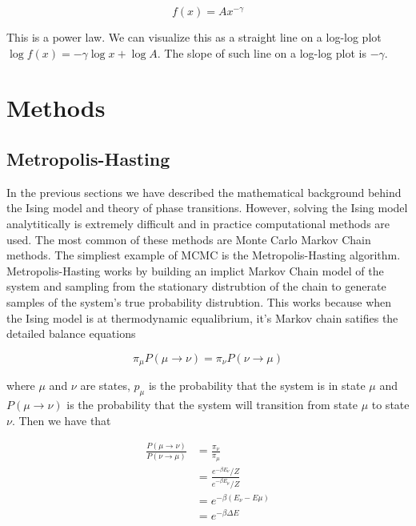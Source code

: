 \documentclass{article}
\begin{document}
\begin{equation}
    f(x) = A x^{-\gamma}
\end{equation}

This is a power law. We can visualize this as a straight line on a log-log plot $\log f(x) = -\gamma \log x + \log A$.
The slope of such line on a log-log plot is $-\gamma$.
 
\section{Methods}
\label{Methods}

\subsection{Metropolis-Hasting}
In the previous sections we have described the mathematical background behind the Ising model and theory of phase transitions.
However, solving the Ising model analytitically is extremely difficult and in practice computational methods are used. The most common of these methods 
are Monte Carlo Markov Chain methods. The simpliest example of MCMC is the Metropolis-Hasting algorithm. Metropolis-Hasting works by building 
an implict Markov Chain model of the system and sampling from the stationary distrubtion of the chain to generate samples of the system's true probability
distrubtion. This works because when the Ising model is at thermodynamic equalibrium, it's Markov chain satifies the detailed balance equations

\begin{equation}
    \pi_{\mu} P(\mu \rightarrow \nu) = \pi_{\nu} P(\nu \rightarrow \mu)
\end{equation}

where $\mu$ and $\nu$ are states, $p_{\mu}$ is the probability that the system is in state $\mu$ and $P(\mu \rightarrow \nu)$
is the probability that the system will transition from state $\mu$ to state $\nu$. Then we have that 

\begin{align}
    \frac{P(\mu \rightarrow \nu)}{P(\nu \rightarrow \mu)}
    &= \frac{\pi_{\nu}}{\pi_{\mu}} \\
    &= \frac{e^{-\beta E_{\nu}} / Z}{e^{-\beta E_{\mu}} / Z} \\
    &= e^{-\beta(E_{\nu} - E{\mu})} \\
    &= e^{-\beta \Delta E}
\end{align}
\end{document}
